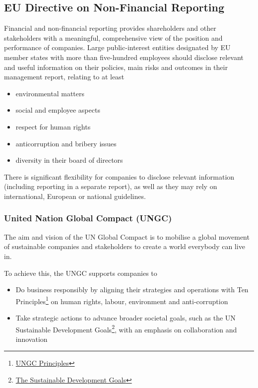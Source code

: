 \documentclass[11pt]{article}
\theoremstyle{definition}
\begin{document}
\clearpage
\subsection{EU Directive on Non-Financial Reporting}
Financial and non-financial reporting provides shareholders and other stakeholders with a meaningful, comprehensive view of the position and performance of companies. Large public-interest entities designated by EU member states with more than
five-hundred employees should disclose relevant and useful information on their policies, main risks and outcomes in their management report, relating to at least
\begin{itemize}[nosep]
	\item environmental matters
	\item social and employee aspects
	\item respect for human rights
	\item anticorruption and bribery issues
	\item diversity in their board of directors
\end{itemize}
There is significant flexibility for companies to disclose relevant information (including reporting in a separate report), as well as they may rely on international, European or national guidelines.

\subsubsection{United Nation Global Compact (UNGC)}
The aim and vision of the UN Global Compact is to mobilise a global movement of sustainable companies and stakeholders to create a world everybody can live in.

To achieve this, the UNGC supports companies to
\begin{itemize}
	\item Do business responsibly by aligning their strategies and operations with Ten Principles\footnote{\href{https://www.unglobalcompact.org/what-is-gc/mission/principles}{UNGC Principles}} on human rights, labour, environment and anti-corruption
	\item Take strategic actions to advance broader societal goals, such as the UN Sustainable Development Goals\footnote{\href{https://www.unglobalcompact.org/what-is-gc/our-work/sustainable-development/sdgs}{The Sustainable Development Goals}}, with an emphasis on collaboration and innovation
\end{itemize}
\end{document}
